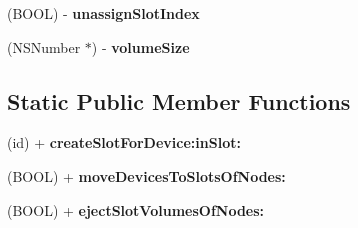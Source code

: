 \begin{DoxyCompactItemize}
\item 
\hypertarget{interface_d_a_c_a_l_slot_a3a5ca84e50a883e87d1d90d4f03f9cdc}{
(BOOL) -\/ {\bfseries unassignSlotIndex}}
\label{interface_d_a_c_a_l_slot_a3a5ca84e50a883e87d1d90d4f03f9cdc}

\item 
\hypertarget{interface_d_a_c_a_l_slot_a8e459f0b97ff16fd70dfae0dee96a363}{
(NSNumber $\ast$) -\/ {\bfseries volumeSize}}
\label{interface_d_a_c_a_l_slot_a8e459f0b97ff16fd70dfae0dee96a363}

\end{DoxyCompactItemize}
\subsection*{Static Public Member Functions}
\begin{DoxyCompactItemize}
\item 
\hypertarget{interface_d_a_c_a_l_slot_ab4c89af6613dc8cbc8e21dd59dbf566c}{
(id) + {\bfseries createSlotForDevice:inSlot:}}
\label{interface_d_a_c_a_l_slot_ab4c89af6613dc8cbc8e21dd59dbf566c}

\item 
\hypertarget{interface_d_a_c_a_l_slot_a8d2e8f5da4411398a52d607bb868ea60}{
(BOOL) + {\bfseries moveDevicesToSlotsOfNodes:}}
\label{interface_d_a_c_a_l_slot_a8d2e8f5da4411398a52d607bb868ea60}

\item 
\hypertarget{interface_d_a_c_a_l_slot_aa5da6089d88d3295a409a1564689b599}{
(BOOL) + {\bfseries ejectSlotVolumesOfNodes:}}
\label{interface_d_a_c_a_l_slot_aa5da6089d88d3295a409a1564689b599}

\end{DoxyCompactItemize}
